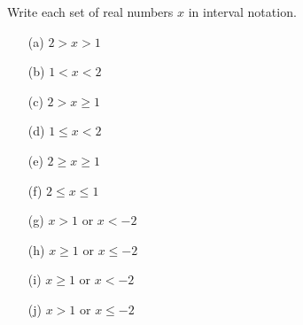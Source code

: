 Write each set of real numbers $x$ in interval notation.
\begin{enumerate}
\item[(a)] $2>x>1$
\item[(b)] $1<x<2$
\item[(c)] $2>x\ge1$
\item[(d)] $1\le x<2$
\item[(e)] $2\ge x\ge1$
\item[(f)] $2\le x\le1$
\item[(g)] $x>1$ or $x<-2$
\item[(h)] $x\ge1$ or $x\le-2$
\item[(i)] $x\ge1$ or $x<-2$
\item[(j)] $x>1$ or $x\le-2$
\end{enumerate}
